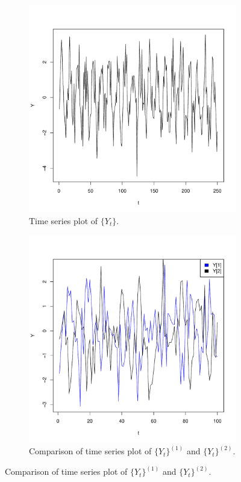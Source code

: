 \documentclass[10pt]{fphw}
\theoremstyle{definition}
\begin{document}
\begin{enumerate}
\begin{figure}
    \centering
    \begin{subfigure}{.5\textwidth}
        \centering
        \includegraphics[width=.85\linewidth]{plot2_b_orig}
    \caption{Time series plot of $\{Y_t\}$.}
    \label{fig:plot2b}
    \end{subfigure}%
    \begin{subfigure}{.5\textwidth}
        \centering
        \includegraphics[width=.85\linewidth]{plot2_b}
    \caption{Comparison of time series plot of $\{Y_t\}^{(1)}$ and $\{Y_t\}^{(2)}$.}
    \label{fig:plot2b_cmp}
    \end{subfigure}
\end{figure}




\end{enumerate}
\end{document}
